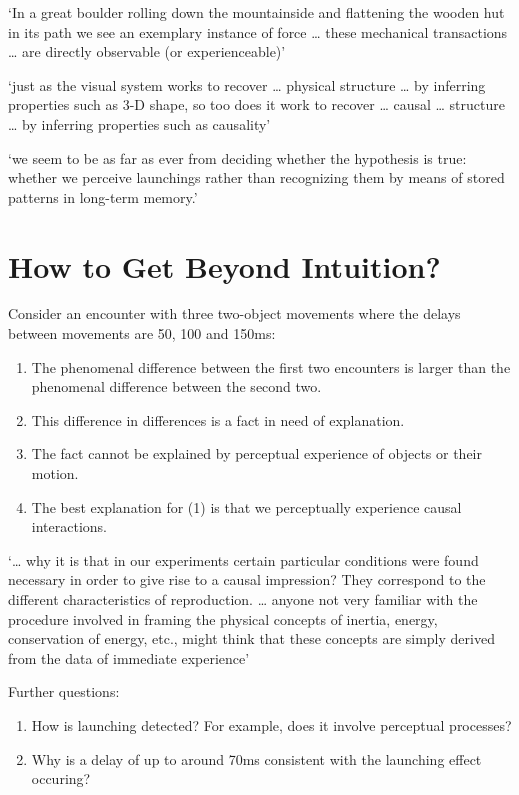 \documentclass[12pt]{extarticle}
\begin{document}
\begin{multicols*}{3}
‘In a great boulder rolling down the mountainside and flattening the wooden hut in its path we see an exemplary instance of force … these mechanical transactions … are directly observable (or experienceable)’
\citep[p.~118]{Strawson:1992yh}

‘just as the visual system works to recover … physical structure … by inferring properties such as 3-D shape, so too does it work to recover … causal … structure … by inferring properties such as causality’
\citep[p.~299]{Scholl:2000eq}

‘we seem to be as far as ever from deciding whether the hypothesis is
true: whether we perceive launchings rather than recognizing them by
means of stored patterns in long-term memory.’
\citep[p.~92]{rips:2011_causation}




\section{How to Get Beyond Intuition?}


Consider an encounter with three two-object movements where the delays between movements are 50, 100 and 150ms:
\begin{enumerate}
\item The phenomenal difference between the first two encounters is larger than the phenomenal difference between the second two.
\item This difference in differences is a fact in need of explanation.
\item The fact cannot be explained by perceptual experience of objects or their motion.
\item The best explanation for (1) is that we perceptually experience causal interactions.
\end{enumerate}

‘… why it is that in our experiments certain particular conditions were
found necessary in order to give rise to a causal impression? They
correspond to the different characteristics of reproduction. …
anyone not very familiar with the procedure involved in framing the
physical concepts of inertia, energy, conservation of energy, etc., might
think that these concepts are simply derived from the data of immediate
experience’
\citep{Michotte:1946nz}

Further questions:
\begin{enumerate}
  \item How is launching detected? For example, does it involve perceptual processes?
\item Why is a delay of up to around 70ms consistent with the launching effect occuring?
\end{enumerate}



\end{multicols*}
\end{document}
